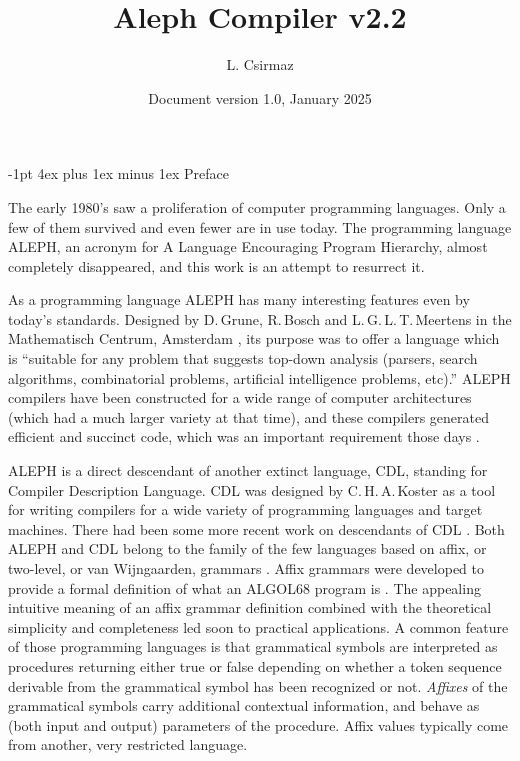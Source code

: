 \documentclass[titlepage]{article}
\title{\bf Aleph Compiler v2.2}
\author{L. Csirmaz}
\date{\normalsize Document version 1.0, January 2025}
\makeatletter
\newcommand\A{\textsf{ALEPH}}
\newcommand\g[1]{\textsf{\color{blue!90!black}#1}}
\renewcommand\section{%
\newpage
\@startsection{section}{1}{\z@}%
   {-1pt}%
   {4ex plus 1ex minus 1ex}%
   {\normalfont\Large\bfseries}}
\let\osection\section
\def\section {\newpage\osection}
\makeatother
\begin{document}
\thispagestyle{empty}
\maketitle
\newpage


\section{Preface}

The early 1980's saw a proliferation of computer programming languages. Only a
few of them survived and even fewer are in use today. The programming
language \A, an acronym for {\sf A} {\sf L}anguage {\sf E}ncouraging {\sf
P}rogram {\sf H}ierarchy, almost completely disappeared, and this work is an
attempt to resurrect it.

As a programming language \A{} has many interesting features even by today's
standards. Designed by D.\,Grune, R.\,Bosch and L.\,G.\,L.\,T.\,Meertens in
the Mathematisch Centrum, Amsterdam \cite{A-manual}, its purpose was to
offer a language which is ``suitable for any problem that suggests top-down
analysis (parsers, search algorithms, combinatorial problems, artificial
intelligence problems, etc).'' \A{} compilers have been constructed for a
wide range of computer architectures (which had a much larger variety at
that time), and these compilers generated efficient and succinct code, which
was an important requirement those days \cite{grune}.

\A{} is a direct descendant of another extinct language, \g{CDL}, standing
for {\sf C}ompiler {\sf D}escription {\sf L}anguage. \g{CDL} was designed by
C.\,H.\,A.\,Koster \cite{koster1,koster3} as a tool for writing compilers
for a wide variety of programming languages and target machines. There had
been some more recent work on descendants of \g{CDL} \cite{cdl3}. Both \A{}
and \g{CDL} belong to the family of the few languages based on affix, or
two-level, or van Wijngaarden, grammars \cite{koster2,wijn}. Affix grammars
were developed to provide a formal definition of what an \g{ALGOL68} program
is \cite{a68}. The appealing intuitive meaning of an affix grammar
definition combined with the theoretical simplicity and completeness led
soon to practical applications. A common feature of those programming
languages is that grammatical symbols are interpreted as procedures
returning either true or false depending on whether a token sequence
derivable from the grammatical symbol has been recognized or not.
\emph{Affixes} of the grammatical symbols carry additional contextual
information, and behave as (both input and output) parameters of the
procedure. Affix values typically come from another, very restricted
language.
\end{document}
